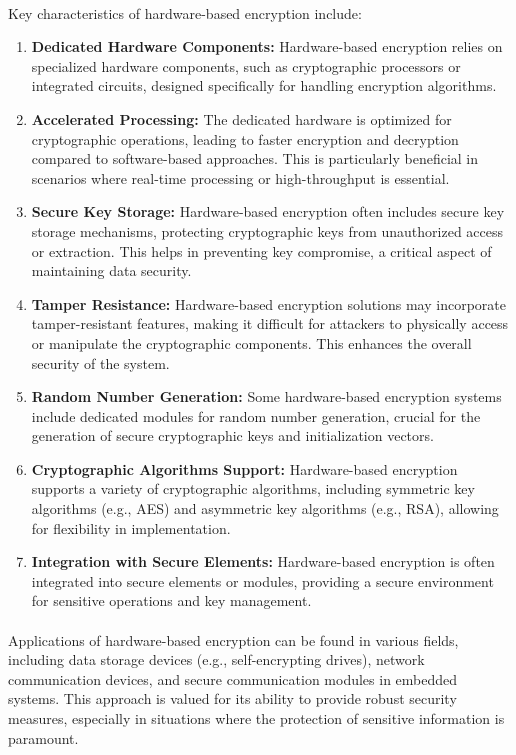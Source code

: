  \paragraph*{}
 Key characteristics of hardware-based encryption include:
 \begin{enumerate}
 	\item \textbf{Dedicated Hardware Components:} Hardware-based encryption relies on specialized hardware components, such as cryptographic processors or integrated circuits, designed specifically for handling encryption algorithms.
 	\item \textbf{Accelerated Processing:} The dedicated hardware is optimized for cryptographic operations, leading to faster encryption and decryption compared to software-based approaches. This is particularly beneficial in scenarios where real-time processing or high-throughput is essential.
 	\item \textbf{Secure Key Storage:} Hardware-based encryption often includes secure key storage mechanisms, protecting cryptographic keys from unauthorized access or extraction. This helps in preventing key compromise, a critical aspect of maintaining data security.
 	\item \textbf{Tamper Resistance:} Hardware-based encryption solutions may incorporate tamper-resistant features, making it difficult for attackers to physically access or manipulate the cryptographic components. This enhances the overall security of the system.
 	\item \textbf{Random Number Generation:} Some hardware-based encryption systems include dedicated modules for random number generation, crucial for the generation of secure cryptographic keys and initialization vectors.
 	\item \textbf{Cryptographic Algorithms Support:} Hardware-based encryption supports a variety of cryptographic algorithms, including symmetric key algorithms (e.g., AES) and asymmetric key algorithms (e.g., RSA), allowing for flexibility in implementation.
 	\item \textbf{Integration with Secure Elements:} Hardware-based encryption is often integrated into secure elements or modules, providing a secure environment for sensitive operations and key management.
 \end{enumerate}
 \paragraph*{}
Applications of hardware-based encryption can be found in various fields, including data storage devices (e.g., self-encrypting drives), network communication devices, and secure communication modules in embedded systems. This approach is valued for its ability to provide robust security measures, especially in situations where the protection of sensitive information is paramount.
